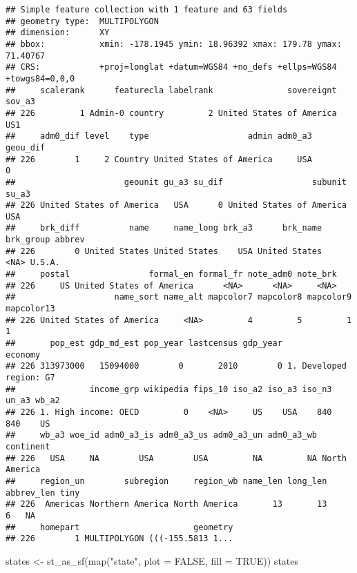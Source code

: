 \documentclass[
]{article}
\newenvironment{Shaded}{\begin{snugshade}}{\end{snugshade}}
\newcommand{\AttributeTok}[1]{\textcolor[rgb]{0.77,0.63,0.00}{#1}}
\newcommand{\ConstantTok}[1]{\textcolor[rgb]{0.00,0.00,0.00}{#1}}
\newcommand{\FunctionTok}[1]{\textcolor[rgb]{0.00,0.00,0.00}{#1}}
\newcommand{\NormalTok}[1]{#1}
\newcommand{\OtherTok}[1]{\textcolor[rgb]{0.56,0.35,0.01}{#1}}
\newcommand{\StringTok}[1]{\textcolor[rgb]{0.31,0.60,0.02}{#1}}
\begin{document}
\begin{verbatim}
## Simple feature collection with 1 feature and 63 fields
## geometry type:  MULTIPOLYGON
## dimension:      XY
## bbox:           xmin: -178.1945 ymin: 18.96392 xmax: 179.78 ymax: 71.40767
## CRS:            +proj=longlat +datum=WGS84 +no_defs +ellps=WGS84 +towgs84=0,0,0
##     scalerank      featurecla labelrank               sovereignt sov_a3
## 226         1 Admin-0 country         2 United States of America    US1
##     adm0_dif level    type                    admin adm0_a3 geou_dif
## 226        1     2 Country United States of America     USA        0
##                      geounit gu_a3 su_dif                  subunit su_a3
## 226 United States of America   USA      0 United States of America   USA
##     brk_diff          name     name_long brk_a3      brk_name brk_group abbrev
## 226        0 United States United States    USA United States      <NA> U.S.A.
##     postal                formal_en formal_fr note_adm0 note_brk
## 226     US United States of America      <NA>      <NA>     <NA>
##                    name_sort name_alt mapcolor7 mapcolor8 mapcolor9 mapcolor13
## 226 United States of America     <NA>         4         5         1          1
##       pop_est gdp_md_est pop_year lastcensus gdp_year                 economy
## 226 313973000   15094000        0       2010        0 1. Developed region: G7
##               income_grp wikipedia fips_10 iso_a2 iso_a3 iso_n3 un_a3 wb_a2
## 226 1. High income: OECD         0    <NA>     US    USA    840   840    US
##     wb_a3 woe_id adm0_a3_is adm0_a3_us adm0_a3_un adm0_a3_wb     continent
## 226   USA     NA        USA        USA         NA         NA North America
##     region_un        subregion     region_wb name_len long_len abbrev_len tiny
## 226  Americas Northern America North America       13       13          6   NA
##     homepart                       geometry
## 226        1 MULTIPOLYGON (((-155.5813 1...
\end{verbatim}

\begin{Shaded}
\begin{Highlighting}[]
\NormalTok{states }\OtherTok{\textless{}{-}} \FunctionTok{st\_as\_sf}\NormalTok{(}\FunctionTok{map}\NormalTok{(}\StringTok{"state"}\NormalTok{, }\AttributeTok{plot =} \ConstantTok{FALSE}\NormalTok{, }\AttributeTok{fill =} \ConstantTok{TRUE}\NormalTok{))}
\NormalTok{states}
\end{Highlighting}
\end{Shaded}
\end{document}
